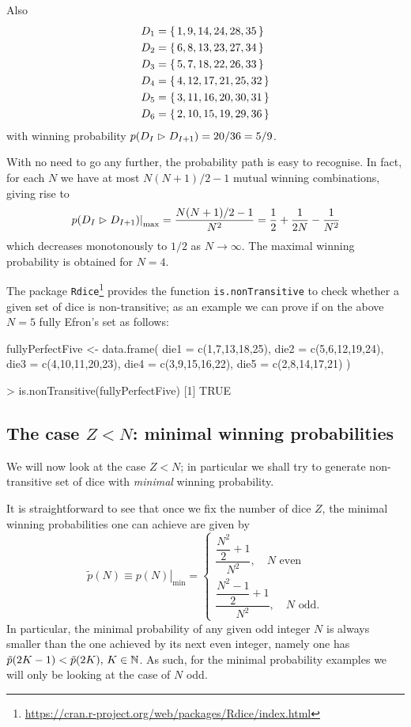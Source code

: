 \begin{example} 
Also 
\begin{align*}
D_1&=\set{1, 9, 14, 24, 28, 35} \\
D_2&=\set{6, 8, 13, 23, 27, 34} \\
D_3&=\set{5, 7, 18, 22, 26, 33} \\
D_4&=\set{4, 12, 17, 21, 25, 32} \\
D_5&=\set{3, 11, 16, 20, 30, 31}\\
D_6&=\set{2, 10, 15, 19, 29, 36}
\end{align*}
with winning probability $p(D_{I}\vartriangleright D_{I+1})=20/36=5/9$.
\end{example}
With no need to go any further, the probability path is 
easy to recognise. In fact, for each $N$ we have at most
$N(N+1)/2 -1$ mutual winning combinations, giving rise to 
\[
\left.p(D_{I}\vartriangleright D_{I+1})\right|_{\textrm{max}}=\frac{N(N+1)/2 -1}{N^2}=\frac{1}{2}+\frac{1}{2N}-\frac{1}{N^2}
\]
which decreases monotonously to $1/2$ as $N\to\infty$. The maximal winning
probability is obtained for $N=4$.

\bigskip
The package \texttt{Rdice}\footnote{\url{https://cran.r-project.org/web/packages/Rdice/index.html}} provides the function \texttt{is.nonTransitive}
to check whether a given set of dice is non-transitive; as an 
example we can prove if on the above $N=5$ fully Efron's set 
as follows:

\begin{code}
fullyPerfectFive <- data.frame(
	  die1 = c(1,7,13,18,25),
	  die2 = c(5,6,12,19,24),
	  die3 = c(4,10,11,20,23),
	  die4 = c(3,9,15,16,22),
	  die5 = c(2,8,14,17,21)
	)
	
> is.nonTransitive(fullyPerfectFive)
[1] TRUE
\end{code}


\subsection{The case $Z< N$: minimal winning probabilities}
We will now look at the case $Z<N$; in particular we shall
try to generate non-transitive set of dice with \emph{minimal}
winning probability.

\bigskip
It is straightforward to see that once we fix the number of 
dice $Z$, the minimal winning probabilities one can achieve
are given by
\begin{equation}
\left. \tilde{p}(N) \equiv p(N)\right|_{\textrm{min}} = 
	\begin{cases}
		\dfrac{\dfrac{N^2}{2}+1}{N^2},\quad N\textrm{ even}\\[2em]
		\dfrac{\dfrac{N^2-1}{2}+1}{N^2},\quad N\textrm{ odd}.
	\end{cases}\label{minimalProb}
\end{equation}
In particular, the minimal probability of any given odd integer $N$
is always smaller than the one achieved by its next even integer, 
namely one has $\tilde{p}(2K-1)<\tilde{p}(2K),\, K\in\mathbb{N}$. As such,
for the minimal probability examples we will only be looking at 
the case of $N$ odd.

